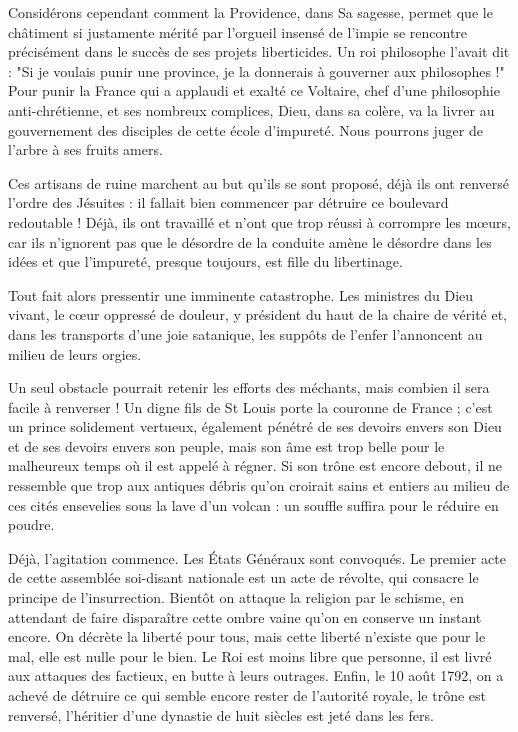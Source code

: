 \documentclass[11pt,a4paper]{report}
\begin{document}
Considérons cependant comment la Providence, dans Sa sagesse, permet que le châtiment si justamente mérité par l'orgueil insensé de l'impie se rencontre précisément dans le succès de ses projets liberticides. Un roi philosophe l'avait dit : "Si je voulais punir une province, je la donnerais à gouverner aux philosophes !" Pour punir la France qui a applaudi et exalté ce Voltaire, chef d'une philosophie anti-chrétienne, et ses nombreux complices, Dieu, dans sa colère, va la livrer au gouvernement des disciples de cette école d'impureté. Nous pourrons juger de l'arbre à ses fruits amers.

Ces artisans de ruine marchent au but qu'ils se sont proposé, déjà ils ont renversé l'ordre des Jésuites : il fallait bien commencer par détruire ce boulevard redoutable ! Déjà, ils ont travaillé et n'ont que trop réussi à corrompre les mœurs, car ils n'ignorent pas que le désordre de la conduite amène le désordre dans les idées et que l'impureté, presque toujours, est fille du libertinage.

Tout fait alors pressentir une imminente catastrophe. Les ministres du Dieu vivant, le cœur oppressé de douleur, y président du haut de la chaire de vérité et, dans les transports d'une joie satanique, les suppôts de l'enfer l'annoncent au milieu de leurs orgies.

Un seul obstacle pourrait retenir les efforts des méchants, mais combien il sera facile à renverser ! Un digne fils de St Louis porte la couronne de France ; c'est un prince solidement vertueux, également pénétré de ses devoirs envers son Dieu et de ses devoirs envers son peuple, mais son âme est trop belle pour le malheureux temps où il est appelé à régner. Si son trône est encore debout, il ne ressemble que trop aux antiques débris qu'on croirait sains et entiers au milieu de ces cités ensevelies sous la lave d'un volcan : un souffle suffira pour le réduire en poudre.

Déjà, l'agitation commence. Les États Généraux sont convoqués. Le premier acte de cette assemblée soi-disant nationale est un acte de révolte, qui consacre le principe de l'insurrection. Bientôt on attaque la religion par le schisme, en attendant de faire disparaître cette ombre vaine qu'on en conserve un instant encore. On décrète la liberté pour tous, mais cette liberté n'existe que pour le mal, elle est nulle pour le bien. Le Roi est moins libre que personne, il est livré aux attaques des factieux, en butte à leurs outrages. Enfin, le 10 août 1792, on a achevé de détruire ce qui semble encore rester de l'autorité royale, le trône est renversé, l'héritier d'une dynastie de huit siècles est jeté dans les fers.
\end{document}
